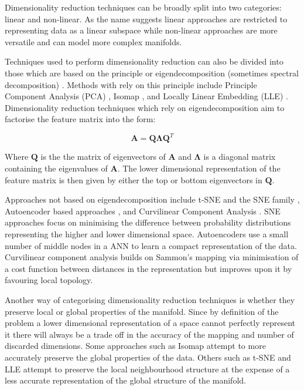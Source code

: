 Dimensionality reduction techniques can be broadly split into two categories: linear and non-linear. As the name suggests linear approaches are restricted to representing data as a linear subspace while non-linear approaches are more versatile and can model more complex manifolds. 

Techniques used to perform dimensionality reduction can also be divided into those which are based on the principle or eigendecomposition (sometimes spectral decomposition)  \cite{strange2014open}. Methods with rely on this principle include Principle Component Analysis (PCA) \cite{shlens2014tutorial}, Isomap \cite{tenenbaum2000global}, and Locally Linear Embedding (LLE) \cite{roweis2000nonlinear} . Dimensionality reduction techniques which rely on eigendecomposition aim to factorise the feature matrix into the form:

\begin{equation}
	\bm{A} = \bm{Q}\bm{\Lambda}\bm{Q}^T
\end{equation}

Where $\bm{Q}$ is the the matrix of eigenvectors of $\bm{A}$ and $\bm{\Lambda}$ is a diagonal matrix containing the eigenvalues of $\bm{A}$. The lower dimensional representation of the feature matrix is then given by either the top or bottom eigenvectors in $\bm{Q}$.

Approaches not based on eigendecomposition include t-SNE and the SNE family \cite{van2008visualizing, hinton2002stochastic}, Autoencoder based approaches \cite{hinton2006reducing}, and Curvilinear Component Analysis \cite{demartines1997curvilinear}. SNE approaches focus on minimising the difference between probability distributions representing the higher and lower dimensional space. Autoencoders use a small number of middle nodes in a ANN to learn a compact representation of the data. Curvilinear component analysis builds on Sammon's mapping via minimisation of a cost function between distances in the representation but improves upon it by favouring local topology.

Another way of categorising dimensionality reduction techniques is whether they preserve local or global properties of the manifold. Since by definition of the problem a lower dimensional representation of a space cannot perfectly represent it there will always be a trade off in the accuracy of the mapping and number of discarded dimensions. Some approaches such as Isomap attempt to more accurately preserve the global properties of the data. Others such as t-SNE and LLE attempt to preserve the local neighbourhood structure at the expense of a less accurate representation of the global structure of the manifold.


